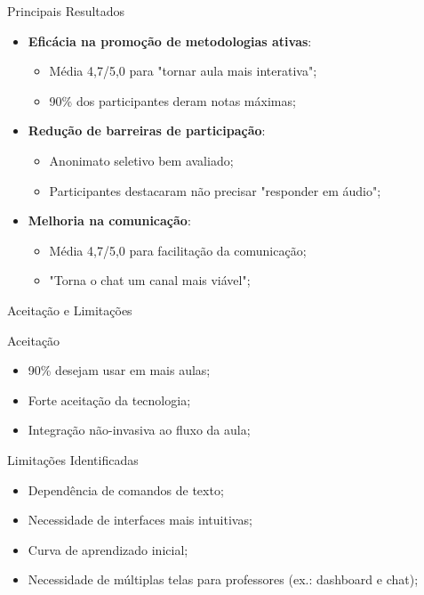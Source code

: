 \documentclass[aspectratio=169]{beamer}
\begin{document}
{\begin{frame}{Principais Resultados}
  \begin{itemize}
  \item \textbf{Eficácia na promoção de metodologias ativas}:
    \begin{itemize}
    \item Média 4,7/5,0 para "tornar aula mais interativa";
    \item 90\% dos participantes deram notas máximas;
    \end{itemize}
  \item \textbf{Redução de barreiras de participação}:
    \begin{itemize}
    \item Anonimato seletivo bem avaliado;
    \item Participantes destacaram não precisar "responder em áudio";
    \end{itemize}
  \item \textbf{Melhoria na comunicação}:
    \begin{itemize}
    \item Média 4,7/5,0 para facilitação da comunicação;
    \item "Torna o chat um canal mais viável";
    \end{itemize}
  \end{itemize}
\end{frame}

\begin{frame}{Aceitação e Limitações}
  \begin{block}{Aceitação}
  \begin{itemize}
  \item 90\% desejam usar em mais aulas;
  \item Forte aceitação da tecnologia;
  \item Integração não-invasiva ao fluxo da aula;
  \end{itemize}
  \end{block}
  
  \begin{block}{Limitações Identificadas}
  \begin{itemize}
  \item Dependência de comandos de texto;
  \item Necessidade de interfaces mais intuitivas;
  \item Curva de aprendizado inicial;
  \item Necessidade de múltiplas telas para professores (ex.: dashboard e chat);
  \end{itemize}
  \end{block}
\end{frame}

}
\end{document}
